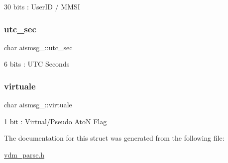 30 bits \+: User\+ID / M\+M\+SI 

\mbox{\label{structaismsg__21_a99bfa826d1d9dc4ddfb37a681d3192e1}} 
\subsubsection{\texorpdfstring{utc\+\_\+sec}{utc\_sec}}
{\footnotesize\ttfamily char aismsg\+\_\+::utc\+\_\+sec}



6 bits \+: U\+TC Seconds 

\mbox{\label{structaismsg__21_a25957600de676c7d6a60cb298527f56a}} 
\subsubsection{\texorpdfstring{virtuale}{virtuale}}
{\footnotesize\ttfamily char aismsg\+\_\+::virtuale}



1 bit \+: Virtual/\+Pseudo AtoN Flag 



The documentation for this struct was generated from the following file\+:\begin{DoxyCompactItemize}
\item 
\mbox{\hyperlink{vdm__parse_8h}{vdm\+\_\+parse.\+h}}\end{DoxyCompactItemize}
